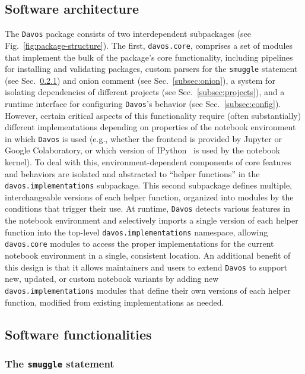 \documentclass[preprint,12pt,a4paper]{elsarticle}
\begin{document}
\subsection{Software architecture}\label{sec:architecture}

The \texttt{Davos} package consists of two interdependent subpackages
(see Fig.~\ref{fig:package-structure}). The first,
\texttt{davos.core}, comprises a set of modules that
implement the bulk of the package's core
functionality, including pipelines for installing and validating
packages, custom parsers for the \texttt{smuggle} statement (see
Sec.~\ref{subsec:smuggle}) and onion comment (see
Sec.~\ref{subsec:onion}), a system for isolating dependencies of
different projects (see Sec.~\ref{subsec:projects}), and a runtime
interface for configuring \texttt{Davos}'s behavior (see Sec.~\ref{subsec:config}).
However, certain critical aspects of this
functionality require (often substantially) different implementations
depending on properties of the notebook environment in which
\texttt{Davos} is used (e.g., whether the frontend is provided by
Jupyter or Google Colaboratory, or which version of
IPython~\cite{PereGran07} is used by the notebook kernel). To deal
with this, environment-dependent components of core features and behaviors
are isolated and abstracted to ``helper functions'' in the
\texttt{davos.implementations} subpackage. This second subpackage
defines multiple, interchangeable versions of each helper function,
organized into modules by the conditions that trigger their use. At
runtime, \texttt{Davos} detects various features in the notebook
environment and selectively imports a single version of each helper
function into the top-level \texttt{davos.implementations} namespace,
allowing \texttt{davos.core} modules to access the proper
implementations for the current notebook environment in a single,
consistent location. An additional benefit of this design is that it
allows maintainers and users to extend \texttt{Davos} to
support new, updated, or custom notebook variants by adding new
\texttt{davos.implementations} modules that define their own versions
of each helper function, modified from existing implementations as
needed.


\subsection{Software functionalities}

\subsubsection{The \texttt{smuggle} statement}\label{subsec:smuggle}
\end{document}
